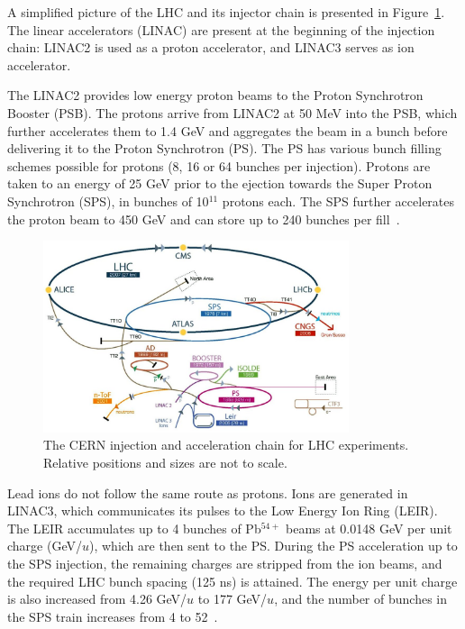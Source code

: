 A simplified picture of the LHC and its injector chain is presented in
Figure~\ref{fig:cern}. The linear accelerators (LINAC) are
present at the beginning of the injection chain: LINAC2 is used as a
proton accelerator, and LINAC3 serves as ion accelerator.

The LINAC2 provides low energy proton beams to the Proton
Synchrotron Booster (PSB). The protons arrive from LINAC2 at 50
MeV into the PSB, which further accelerates them to 1.4 GeV and
aggregates the beam in a bunch before delivering it to the
Proton Synchrotron (PS). The PS has various bunch filling schemes
possible for protons (8, 16 or 64 bunches per injection).
Protons are taken to an energy of 25 GeV prior to the ejection towards the
Super Proton Synchrotron (SPS), in bunches of 10$^{11}$ protons
each. The SPS further accelerates the proton beam to 450 GeV and can
store up to 240 bunches per fill~\cite{Schindl:384396}. 

\begin{figure}[h]
  \begin{center}
    \includegraphics[width=0.8\textwidth]{Chapters/xLHCMS/cernschema.jpg}
    \caption{The CERN injection and acceleration chain for LHC
      experiments. Relative positions and sizes are not to scale.}
    \label{fig:cern}
  \end{center}
\end{figure}

Lead ions do not follow the same route as protons. Ions are generated
in LINAC3, which communicates its pulses to the Low
Energy Ion Ring (LEIR). The LEIR accumulates up to 4 bunches of
Pb$^{54+}$ beams at 0.0148 GeV per unit charge (GeV/$u$), which are
then sent to the PS. During the PS
acceleration up to the SPS injection, the remaining charges are stripped from the ion
beams, and the required LHC bunch spacing (125 ns) is attained. The
energy per unit charge is also increased from 4.26 GeV/$u$ to 177
GeV/$u$, and the number of bunches in the SPS train increases from 4
to 52~\cite{Schindl:384396}.



